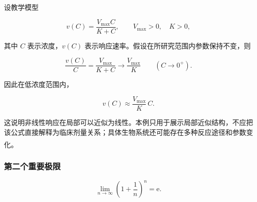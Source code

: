 \documentclass[fontset=fandol]{ctexart}
\newcommand{\ee}{\mathrm{e}}
\newcommand{\upcite}[1]{\textsuperscript{\textsuperscript{\cite{#1}}}}
\begin{document}
\begin{application}

设教学模型

\[

v(C)=\frac{V_{\max}C}{K+C},\qquad V_{\max}>0,\quad K>0,

\]

其中 $C$ 表示浓度，$v(C)$ 表示响应速率。假设在所研究范围内参数保持不变，则

\[

\frac{v(C)}{C}=\frac{V_{\max}}{K+C}

\longrightarrow\frac{V_{\max}}K

\qquad(C\to0^+).

\]

因此在低浓度范围内，

\[

v(C)\approx\frac{V_{\max}}K\,C.

\]

这说明非线性响应在局部可以近似为线性。本例只用于展示局部近似结构，不应把该公式直接解释为临床剂量关系；具体生物系统还可能存在多种反应途径和参数变化。\upcite{NCBIEnzyme}

\end{application}



\subsubsection*{第二个重要极限}





\begin{theorem}[自然常数 e ]

	\[

	\lim_{n\to\infty} \left(1 + \dfrac{1}{n}\right)^n = \ee.

	\]

\end{theorem}
\end{document}
